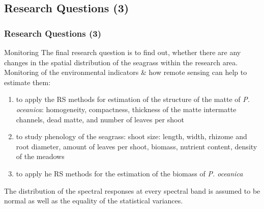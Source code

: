 \documentclass[pdflatex,compress,8pt,
	xcolor={dvipsnames,dvipsnames,svgnames,x11names,table},
	hyperref={colorlinks = true,breaklinks = true, urlcolor = NavyBlue, breaklinks = true}]{beamer}
\begin{document}
\subsection{Research Questions (3)}
\begin{frame}\frametitle{Research Questions (3)}
\begin{alertblock}{Monitoring}
The final research question is to find out, whether there are any changes in the spatial distribution of the seagrass within the research area. Monitoring of the environmental indicators \& how remote sensing can help to estimate them:
\begin{enumerate}
	\item to apply the RS methods for estimation of the structure of the matte of \emph{P. oceanica}: homogeneity, compactness, thickness of the matte intermatte channels, dead matte, and number of leaves per shoot
	\item to study phenology of the seagrass: shoot size: length, width, rhizome and root diameter, amount of leaves per shoot, biomass, nutrient content, density of the meadows
	\item to apply he RS methods for the estimation of the biomass of \emph{P. oceanica}
\end{enumerate}
The distribution of the spectral responses at every spectral band is assumed to be normal as well as the equality of the statistical variances.
\end{alertblock}

\end{frame}
\end{document}
